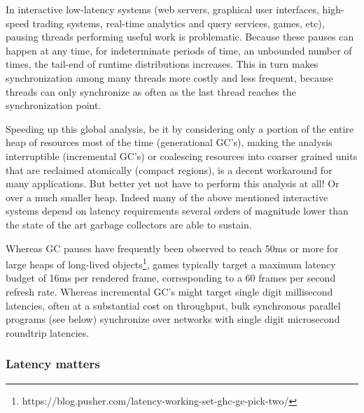 \documentclass[11pt]{article}
\begin{document}
In interactive low-latency systems (web servers, graphical user
interfaces, high-speed trading systems, real-time analytics and query
services, games, etc), pausing threads performing useful work is
problematic. Because these pauses can happen at any time, for
indeterminate periods of time, an unbounded number of times, the
tail-end of runtime distributions increases. This in turn makes
synchronization among many threads more costly and less frequent,
because threads can only synchronize as often as the last thread
reaches the synchronization point.

Speeding up this global analysis, be it by considering only a portion
of the entire heap of resources most of the time (generational GC's),
making the analysis interruptible (incremental GC's) or coalescing
resources into coarser grained units that are reclaimed atomically
(compact regions), is a decent workaround for many applications. But
better yet not have to perform this analysis at all! Or over a much
smaller heap. Indeed many of the above mentioned interactive systems
depend on latency requirements several orders of magnitude lower than
the state of the art garbage collectors are able to sustain.

Whereas GC pauses have frequently been observed to reach 50ms or more
for large heaps of long-lived
objects\footnote{https://blog.pusher.com/latency-working-set-ghc-gc-pick-two/},
games typically target a maximum latency budget of 16ms per rendered
frame, corresponding to a 60 frames per second refresh rate. Whereas
incremental GC's might target single digit millisecond latencies,
often at a substantial cost on throughput, bulk synchronous parallel
programs (see below) synchronize over networks with single digit
microsecond roundtrip latencies.

\subsubsection{Latency matters}
\end{document}
